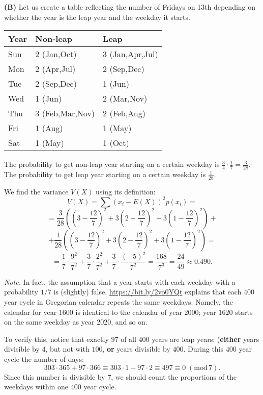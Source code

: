 \documentclass[jou]{apa6}
\begin{document}
{\bf (B)} Let us create a table reflecting the number of Fridays on 13th 
depending on whether the year is the leap year and the weekday it starts. 

\begin{tabular}{|l|l|l|} \hline
Year & Non-leap & Leap \\ \hline
Sun & 2 (Jan,Oct) & 3 (Jan,Apr,Jul) \\ \hline
Mon & 2 (Apr,Jul) & 2 (Sep,Dec) \\ \hline
Tue & 2 (Sep,Dec) & 1 (Jun) \\ \hline
Wed & 1 (Jun) & 2 (Mar,Nov) \\ \hline
Thu & 3 (Feb,Mar,Nov) & 2 (Feb,Aug) \\ \hline
Fri & 1 (Aug) & 1 (May) \\ \hline
Sat & 1 (May) &  1 (Oct) \\ \hline
\end{tabular}

The probability to get non-leap year starting on a certain 
weekday is $\frac{3}{4}\cdot\frac{1}{7} = \frac{3}{28}$. 
The probability to get leap year starting on a certain weekday
is $\frac{1}{28}$.

We find the variance $V(X)$ using its definition:
$$V(X) = \sum (x_i - E(X))^2 p(x_i) = $$
$$ = \frac{3}{28}\left( \left( 3 - \frac{12}{7} \right)^2 + 
3\left( 2 - \frac{12}{7} \right)^2 + 3\left( 1 - \frac{12}{7} \right)^2 \right) + $$ 
$$ + \frac{1}{28}\left( \left( 3 - \frac{12}{7} \right)^2 + 
3\left( 2 - \frac{12}{7} \right)^2 + 3\left( 1 - \frac{12}{7} \right)^2 \right) = $$ 
$$ = \frac{1}{7}\cdot\frac{9^2}{7^2} + \frac{3}{7}\cdot\frac{2^2}{7^2} + 
\frac{3}{7}\cdot\frac{(-5)^2}{7^2} = \frac{168}{7^3} = \frac{24}{49} 
\approx 0.490.$$ 






{\em Note.} In fact, the assumption that a year starts with each 
weekday with a probability $1/7$ is (slightly) false.
\url{https://bit.ly/2vo0YQt} explains that each $400$ year cycle in Gregorian calendar
repeats the same weekdays. Namely, the calendar for year $1600$ is identical to 
the calendar of year $2000$; year $1620$ starts on the same weekday as 
year $2020$, and so on.

To verify this, notice that exactly $97$ of all $400$ years are leap years:
({\bf either} years divisible by $4$, but not with $100$, {\bf or} years divisible
by $400$. During this $400$ year cycle the number of days:
$$303 \cdot 365 + 97 \cdot 366 \equiv 303 \cdot 1 + 97 \cdot 2 \equiv 497 \equiv 0\;(\text{mod}\,7).$$
Since this number is divisible by $7$, we should count the proportions 
of the weekdays within one $400$ year cycle. 
\end{document}

